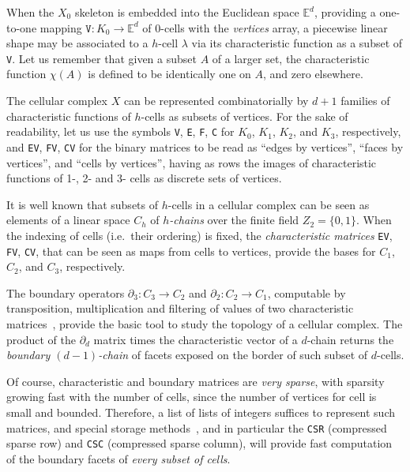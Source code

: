 \documentclass[]{egpubl}
\def\E{\mathbb{E}}
\begin{document}
When the $X_0$ skeleton is embedded into the Euclidean space $\E^d$, providing a one-to-one mapping $\texttt{V}: K_0 \to \E^d$ of 0-cells with the \emph{vertices} array, a piecewise linear shape may be associated to a $h$-cell $\lambda$ via its characteristic function  as a subset of \texttt{V}. Let us remember that given a subset $A$ of a larger set, the characteristic function $\chi(A)$ is defined to be identically one on $A$, and zero elsewhere. 

The cellular complex $X$ can be represented combinatorially  by $d+1$ families of characteristic functions of $h$-cells as subsets of vertices. For the sake of readability, let us use the symbols  \texttt{V}, \texttt{E}, \texttt{F}, \texttt{C} for $K_0$, $K_1$, $K_2$, and $K_3$, respectively, and \texttt{EV}, \texttt{FV}, \texttt{CV} for the binary matrices to be read as ``edges by vertices'', ``faces by vertices'', and ``cells by vertices'', having as rows the images of characteristic functions of 1-, 2- and 3- cells as discrete sets of vertices.

It is well known that subsets of $h$-cells in a cellular complex can be seen as elements of a linear space $C_h$ of \emph{$h$-chains} over the finite field $Z_2 = \{0,1\}$. When the indexing of cells (i.e.~their ordering) is fixed, the \emph{characteristic matrices} \texttt{EV}, \texttt{FV}, \texttt{CV}, that can be seen as maps from cells to vertices, provide the bases for $C_1$, $C_2$, and $C_3$, respectively. 

The boundary operators $\partial_3: C_3 \to C_2$ and $\partial_2: C_2 \to C_1$, computable by transposition, multiplication and filtering of values of two characteristic matrices~\cite{Dicarlo:2014:TNL:2543138.2543294}, provide the basic tool to study the topology of a cellular complex. The product of the $\partial_d$ matrix  times the characteristic vector of a $d$-chain returns the \emph{boundary $(d-1)$-chain} of facets exposed on the border of such subset of $d$-cells.   

Of course, characteristic and boundary matrices are \emph{very sparse}, with sparsity growing fast with the number of cells, since the number of vertices for cell is small and bounded. Therefore, a list of lists of integers suffices to represent such matrices, and special storage methods~\cite{gemmexp}, and in particular the \texttt{CSR} (compressed sparse row)  and \texttt{CSC} (compressed sparse column), will provide fast computation of the boundary facets of \emph{every subset of cells}.
\end{document}
